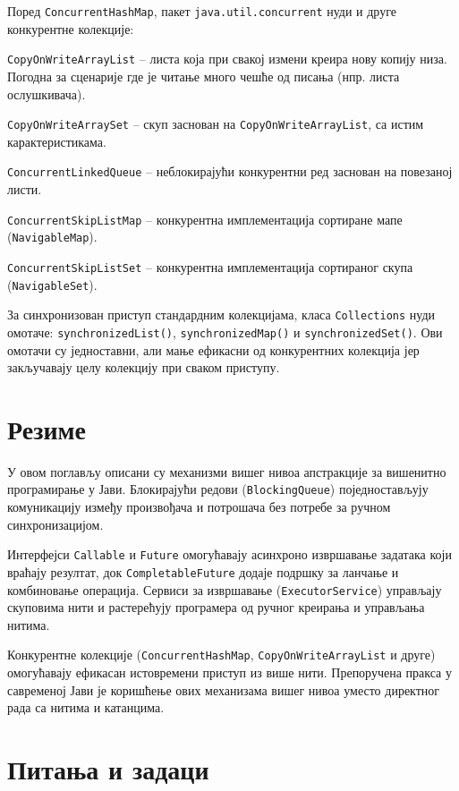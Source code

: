 Поред \texttt{ConcurrentHashMap}, пакет \texttt{java.util.concurrent} нуди и друге конкурентне колекције:

\texttt{CopyOnWriteArrayList} – листа која при свакој измени креира нову копију низа. Погодна за сценарије где је читање много чешће од писања (нпр. листа ослушкивача).

\texttt{CopyOnWriteArraySet} – скуп заснован на \texttt{CopyOnWriteArrayList}, са истим карактеристикама.

\texttt{ConcurrentLinkedQueue} – неблокирајући конкурентни ред заснован на повезаној листи.

\texttt{ConcurrentSkipListMap} – конкурентна имплементација сортиране мапе (\texttt{NavigableMap}).

\texttt{ConcurrentSkipListSet} – конкурентна имплементација сортираног скупа (\texttt{NavigableSet}).

За синхронизован приступ стандардним колекцијама, класа \texttt{Collections} нуди омотаче: \texttt{synchronizedList()}, \texttt{synchronizedMap()} и \texttt{synchronizedSet()}. Ови омотачи су једноставни, али мање ефикасни од конкурентних колекција јер закључавају целу колекцију при сваком приступу.


\section{Резиме}

У овом поглављу описани су механизми вишег нивоа апстракције за вишенитно програмирање у Јави. Блокирајући редови (\texttt{BlockingQueue}) поједностављују комуникацију између произвођача и потрошача без потребе за ручном синхронизацијом.

Интерфејси \texttt{Callable} и \texttt{Future} омогућавају асинхроно извршавање задатака који враћају резултат, док \texttt{CompletableFuture} додаје подршку за ланчање и комбиновање операција. Сервиси за извршавање (\texttt{ExecutorService}) управљају скуповима нити и растерећују програмера од ручног креирања и управљања нитима.

Конкурентне колекције (\texttt{ConcurrentHashMap}, \texttt{CopyOnWriteArrayList} и друге) омогућавају ефикасан истовремени приступ из више нити. Препоручена пракса у савременој Јави је коришћење ових механизама вишег нивоа уместо директног рада са нитима и катанцима.


\section{Питања и задаци}

